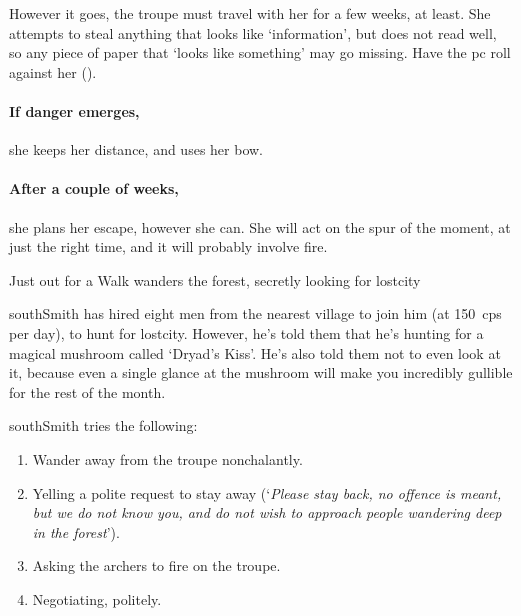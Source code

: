 However it goes, the troupe must travel with her for a few weeks, at least.
She attempts to steal anything that looks like `information', but does not read well, so any piece of paper that `looks like something' may go missing.
Have the \gls{pc} roll  against her  (\tn).

\paragraph{If danger emerges,}
she keeps her distance, and uses her bow.

\paragraph{After a couple of weeks,}
she plans her escape, however she can.
She will act on the spur of the moment, at just the right time, and it will probably involve fire.

\southRogue
\label{southRogue}

{Just out for a Walk}%
{ wanders the forest, secretly looking for \gls{lostcity}}%

\Gls{southSmith} has hired eight men from the nearest \gls{village} to join him (at 150~\glspl{cp} per day), to hunt for \gls{lostcity}.
However, he's told them that he's hunting for a magical mushroom called `Dryad's Kiss'.%
He's also told them not to even look at it, because even a single glance at the mushroom will make you incredibly gullible for the rest of the month.

\renewcommand\npcQuote{You don't need to trust us to speak politely.  Can we start again?}

\Gls{southSmith} tries the following:

\begin{enumerate}
  \item
  Wander away from the troupe nonchalantly.
  \item
  Yelling a polite request to stay away (`\textit{Please stay back, no offence is meant, but we do not know you, and do not wish to approach people wandering deep in the forest}').
  \item
  Asking the archers to fire on the troupe.
  \item
  Negotiating, politely.
\end{enumerate}


